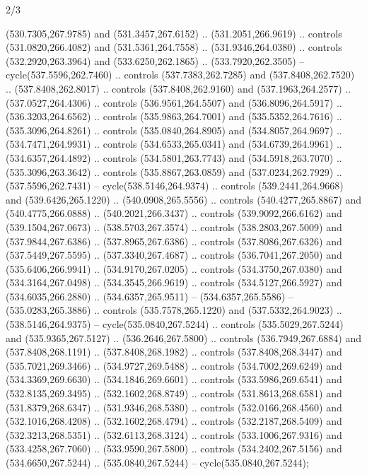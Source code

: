 \begin{flagdescription}{2/3}
\begin{scope}[xshift=0.5\flaglength,yshift=0.5\flagwidth,scale=\flagwidth/495.65]
\begin{scope}[y=0.8pt, x=0.8pt, yscale=-1,shift={(-463.76,-309.78)}]
  (530.7305,267.9785) and (531.3457,267.6152) .. (531.2051,266.9619) .. controls
  (531.0820,266.4082) and (531.5361,264.7558) .. (531.9346,264.0380) .. controls
  (532.2920,263.3964) and (533.6250,262.1865) .. (533.7920,262.3505) --
  cycle(537.5596,262.7460) .. controls (537.7383,262.7285) and
  (537.8408,262.7520) .. (537.8408,262.8017) .. controls (537.8408,262.9160) and
  (537.1963,264.2577) .. (537.0527,264.4306) .. controls (536.9561,264.5507) and
  (536.8096,264.5917) .. (536.3203,264.6562) .. controls (535.9863,264.7001) and
  (535.5352,264.7616) .. (535.3096,264.8261) .. controls (535.0840,264.8905) and
  (534.8057,264.9697) .. (534.7471,264.9931) .. controls (534.6533,265.0341) and
  (534.6739,264.9961) .. (534.6357,264.4892) .. controls (534.5801,263.7743) and
  (534.5918,263.7070) .. (535.3096,263.3642) .. controls (535.8867,263.0859) and
  (537.0234,262.7929) .. (537.5596,262.7431) -- cycle(538.5146,264.9374) ..
  controls (539.2441,264.9668) and (539.6426,265.1220) .. (540.0908,265.5556) ..
  controls (540.4277,265.8867) and (540.4775,266.0888) .. (540.2021,266.3437) ..
  controls (539.9092,266.6162) and (539.1504,267.0673) .. (538.5703,267.3574) ..
  controls (538.2803,267.5009) and (537.9844,267.6386) .. (537.8965,267.6386) ..
  controls (537.8086,267.6326) and (537.5449,267.5595) .. (537.3340,267.4687) ..
  controls (536.7041,267.2050) and (535.6406,266.9941) .. (534.9170,267.0205) ..
  controls (534.3750,267.0380) and (534.3164,267.0498) .. (534.3545,266.9619) ..
  controls (534.5127,266.5927) and (534.6035,266.2880) .. (534.6357,265.9511) --
  (534.6357,265.5586) -- (535.0283,265.3886) .. controls (535.7578,265.1220) and
  (537.5332,264.9023) .. (538.5146,264.9375) -- cycle(535.0840,267.5244) ..
  controls (535.5029,267.5244) and (535.9365,267.5127) .. (536.2646,267.5800) ..
  controls (536.7949,267.6884) and (537.8408,268.1191) .. (537.8408,268.1982) ..
  controls (537.8408,268.3447) and (535.7021,269.3466) .. (534.9727,269.5488) ..
  controls (534.7002,269.6249) and (534.3369,269.6630) .. (534.1846,269.6601) ..
  controls (533.5986,269.6541) and (532.8135,269.3495) .. (532.1602,268.8749) ..
  controls (531.8613,268.6581) and (531.8379,268.6347) .. (531.9346,268.5380) ..
  controls (532.0166,268.4560) and (532.1016,268.4208) .. (532.1602,268.4794) ..
  controls (532.2187,268.5409) and (532.3213,268.5351) .. (532.6113,268.3124) ..
  controls (533.1006,267.9316) and (533.4258,267.7060) .. (533.9590,267.5800) ..
  controls (534.2402,267.5156) and (534.6650,267.5244) .. (535.0840,267.5244) --
  cycle(535.0840,267.5244);
\end{scope}

\end{scope}
\end{flagdescription}
